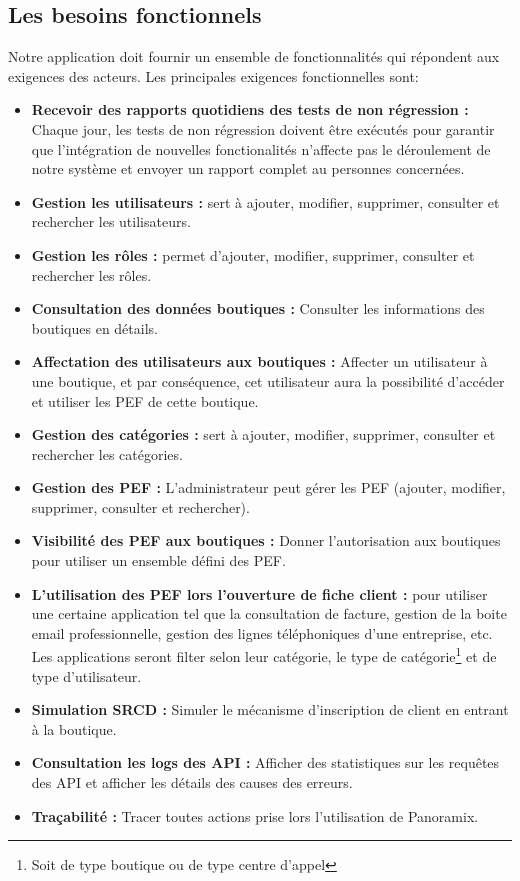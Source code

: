\subsection[Les besoins fonctionnels]{Les besoins fonctionnels}
Notre application doit fournir un ensemble de fonctionnalités qui répondent aux exigences des acteurs. Les principales exigences fonctionnelles sont:
\begin{itemize}
	\item \textbf{Recevoir des rapports quotidiens des tests de non régression :} Chaque jour, les tests de non régression doivent être exécutés pour garantir que l'intégration de nouvelles fonctionalités n'affecte pas le déroulement de notre système et envoyer un rapport complet au personnes concernées.
	\item \textbf{Gestion les utilisateurs :} sert à ajouter, modifier, supprimer, consulter et rechercher les utilisateurs.
	\item \textbf{Gestion les rôles :}  permet d'ajouter, modifier, supprimer, consulter et rechercher les rôles.
	\item \textbf{Consultation des données boutiques :} Consulter les informations des boutiques en détails.
	\item \textbf{Affectation des utilisateurs aux boutiques :} Affecter un utilisateur à une boutique, et par conséquence, cet utilisateur aura la possibilité d'accéder et utiliser les PEF de cette boutique. 
	\item \textbf{Gestion des catégories :} sert à ajouter, modifier, supprimer, consulter et rechercher les catégories.
	\item \textbf{Gestion des PEF :} L'administrateur peut gérer les PEF (ajouter, modifier, supprimer, consulter et rechercher).
	\item \textbf{Visibilité des PEF aux boutiques :} Donner l'autorisation aux boutiques pour utiliser un ensemble défini des PEF.
	\item \textbf{L’utilisation des PEF lors l’ouverture de fiche client :} pour utiliser une certaine application tel que la consultation de facture, gestion de la boite email professionnelle, gestion des lignes téléphoniques d’une entreprise, etc. Les applications seront filter selon leur catégorie, le type de catégorie\footnote{Soit de type boutique ou de type centre d'appel} et de type d'utilisateur.
	\item \textbf{Simulation SRCD :} Simuler le mécanisme d'inscription de client en entrant à la boutique.
	\item \textbf{Consultation les logs des API :} Afficher des statistiques sur les requêtes des API et afficher les détails des causes des erreurs.
	\item \textbf{Traçabilité :} Tracer toutes actions prise lors l'utilisation de Panoramix.
\end{itemize}
